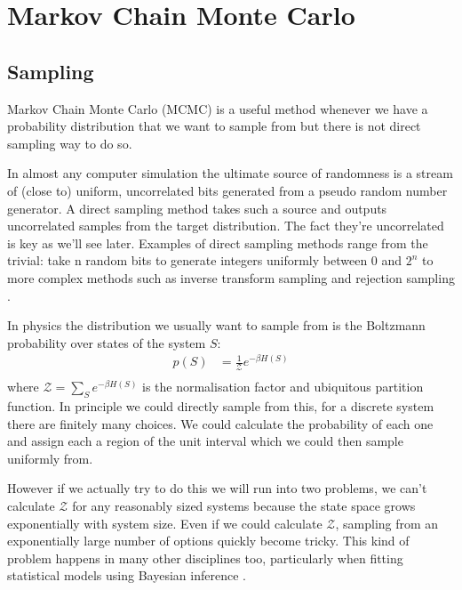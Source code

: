 \hypertarget{markov-chain-monte-carlo}{%
\section{Markov Chain Monte Carlo}\label{markov-chain-monte-carlo}}

\hypertarget{sampling}{%
\subsection{Sampling}\label{sampling}}

Markov Chain Monte Carlo (MCMC) is a useful method whenever we have a probability distribution that we want to sample from but there is not direct sampling way to do so.

In almost any computer simulation the ultimate source of randomness is a stream of (close to) uniform, uncorrelated bits generated from a pseudo random number generator. A direct sampling method takes such a source and outputs uncorrelated samples from the target distribution. The fact they're uncorrelated is key as we'll see later. Examples of direct sampling methods range from the trivial: take n random bits to generate integers uniformly between 0 and \(2^n\) to more complex methods such as inverse transform sampling and rejection sampling \autocite{devroyeRandomSampling1986}.

In physics the distribution we usually want to sample from is the Boltzmann probability over states of the system \(S\): \[
\begin{aligned}
p(S)  &= \frac{1}{\mathcal{Z}} e^{-\beta H(S)} \\
\end{aligned}
\] where \(\mathcal{Z} = \sum_S e^{-\beta H(S)}\) is the normalisation factor and ubiquitous partition function. In principle we could directly sample from this, for a discrete system there are finitely many choices. We could calculate the probability of each one and assign each a region of the unit interval which we could then sample uniformly from.

However if we actually try to do this we will run into two problems, we can't calculate \(\mathcal{Z}\) for any reasonably sized systems because the state space grows exponentially with system size. Even if we could calculate \(\mathcal{Z}\), sampling from an exponentially large number of options quickly become tricky. This kind of problem happens in many other disciplines too, particularly when fitting statistical models using Bayesian inference \autocite{BMCP2021}.

